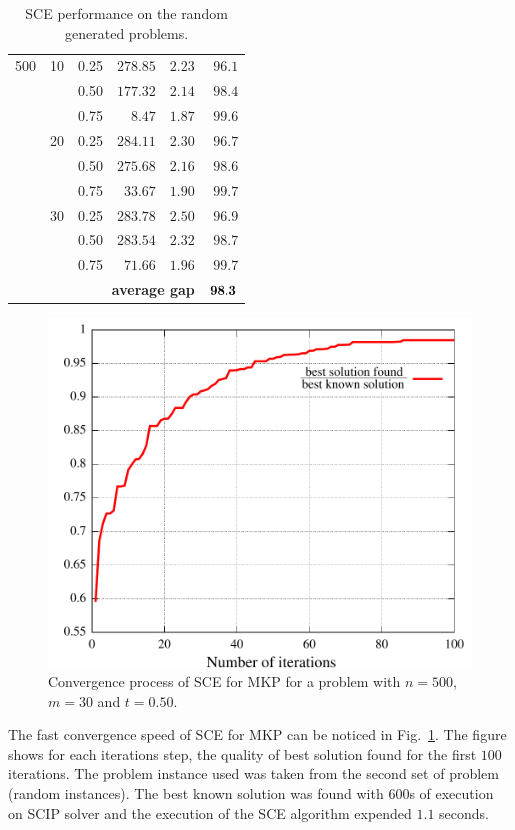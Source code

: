 \documentclass[10pt,conference, compsocconf]{IEEEtran}
\begin{document}
\begin{table}
{\begin{center}
\begin{tabular}[c]{|r|r|r|rrr|}
500 & 10 & 0.25 & $278.85$ & $  2.23$  & $96.1$ \\
    &    & 0.50 & $177.32$ & $  2.14$  & $98.4$ \\
    &    & 0.75 & $  8.47$ & $  1.87$  & $99.6$ \\ \cline{2-6}
    & 20 & 0.25 & $284.11$ & $  2.30$  & $96.7$ \\
    &    & 0.50 & $275.68$ & $  2.16$  & $98.6$ \\
    &    & 0.75 & $ 33.67$ & $  1.90$  & $99.7$ \\ \cline{2-6}
    & 30 & 0.25 & $283.78$ & $  2.50$  & $96.9$ \\
    &    & 0.50 & $283.54$ & $  2.32$  & $98.7$ \\
    &    & 0.75 & $ 71.66$ & $  1.96$  & $99.7$ \\ \cline{2-6}
    & \multicolumn{4}{r}{\textbf{average gap}}  & $\bf 98.3$  \\ \hline
\end{tabular}
\end{center}
}
 \caption{SCE performance on the random generated problems.}
 \label{tab:rand}
\end{table}

\begin{figure}
  \includegraphics[scale=0.5]{imgs/iter}
  \caption{Convergence process of SCE for MKP
    for a problem with $n=500$, $m=30$ and $t=0.50$.}
  \label{fig:iter}
\end{figure}

The fast convergence speed of SCE for MKP can be noticed in Fig.~\ref{fig:iter}.
The figure shows for each iterations step, the quality of best solution found
for the first $100$ iterations.
The problem instance used was taken from the second set of problem (random instances).
The best known solution was found with $600$s of execution on SCIP solver and
the execution of the SCE algorithm expended $1.1$ seconds.
\end{document}
